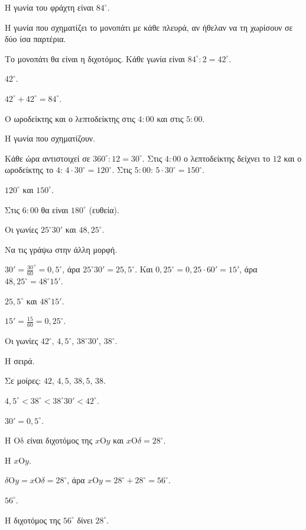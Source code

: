
\tixero Η γωνία του φράχτη είναι $84^\circ$.\par
\tithelo Η γωνία που σχηματίζει το μονοπάτι με κάθε πλευρά, αν ήθελαν να τη χωρίσουν σε δύο ίσα παρτέρια.\par
\possindeo Το μονοπάτι θα είναι η διχοτόμος. Κάθε γωνία είναι $84^\circ:2=42^\circ$.\par
\apantisi $42^\circ$.\par
\elegxos $42^\circ+42^\circ=84^\circ$.

\tixero Ο ωροδείκτης και ο λεπτοδείκτης στις $4{:}00$ και στις $5{:}00$.\par
\tithelo Η γωνία που σχηματίζουν.\par
\possindeo Κάθε ώρα αντιστοιχεί σε $360^\circ:12=30^\circ$. Στις $4{:}00$ ο λεπτοδείκτης δείχνει το $12$ και ο ωροδείκτης το $4$: $4\cdot30^\circ=120^\circ$. Στις $5{:}00$: $5\cdot30^\circ=150^\circ$.\par
\apantisi $120^\circ$ και $150^\circ$.\par
\elegxos Στις $6{:}00$ θα είναι $180^\circ$ (ευθεία).

\tixero Οι γωνίες $25^\circ30'$ και $48{,}25^\circ$.\par
\tithelo Να τις γράψω στην άλλη μορφή.\par
\possindeo $30'=\frac{30}{60}^\circ=0{,}5^\circ$, άρα $25^\circ30'=25{,}5^\circ$. Και $0{,}25^\circ=0{,}25\cdot60'=15'$, άρα $48{,}25^\circ=48^\circ15'$.\par
\apantisi $25{,}5^\circ$ και $48^\circ15'$.\par
\elegxos $15'=\frac{15}{60}=0{,}25^\circ$.

\tixero Οι γωνίες $42^\circ$, $4{,}5^\circ$, $38^\circ30'$, $38^\circ$.\par
\tithelo Η σειρά.\par
\possindeo Σε μοίρες: $42$, $4{,}5$, $38{,}5$, $38$.\par
\apantisi $4{,}5^\circ<38^\circ<38^\circ30'<42^\circ$.\par
\elegxos $30'=0{,}5^\circ$.

\tixero Η $\mathrm{Οδ}$ είναι διχοτόμος της $x\mathrm{Ο}y$ και $x\mathrm{Ο}\delta=28^\circ$.\par
\tithelo Η $x\mathrm{Ο}y$.\par
\possindeo $\delta\mathrm{Ο}y=x\mathrm{Ο}\delta=28^\circ$, άρα $x\mathrm{Ο}y=28^\circ+28^\circ=56^\circ$.\par
\apantisi $56^\circ$.\par
\elegxos Η διχοτόμος της $56^\circ$ δίνει $28^\circ$.

